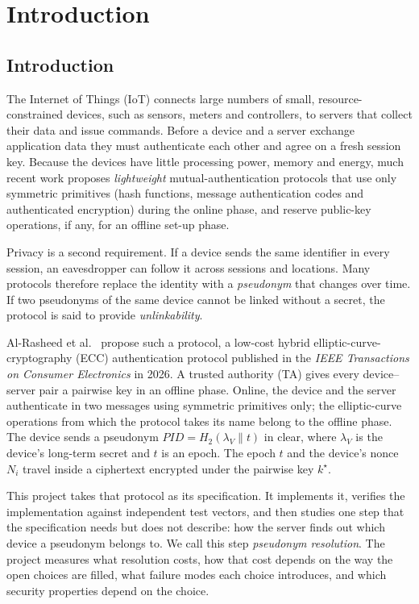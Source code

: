 \chapter{Introduction}

\section{Introduction}
The Internet of Things (IoT) connects large numbers of small, resource-constrained devices, such as sensors, meters and controllers, to servers that collect their data and issue commands. Before a device and a server exchange application data they must authenticate each other and agree on a fresh session key. Because the devices have little processing power, memory and energy, much recent work proposes \emph{lightweight} mutual-authentication protocols that use only symmetric primitives (hash functions, message authentication codes and authenticated encryption) during the online phase, and reserve public-key operations, if any, for an offline set-up phase.

Privacy is a second requirement. If a device sends the same identifier in every session, an eavesdropper can follow it across sessions and locations. Many protocols therefore replace the identity with a \emph{pseudonym} that changes over time. If two pseudonyms of the same device cannot be linked without a secret, the protocol is said to provide \emph{unlinkability}.

Al-Rasheed et al.~\cite{base} propose such a protocol, a low-cost hybrid elliptic-curve-cryptography (ECC) authentication protocol published in the \emph{IEEE Transactions on Consumer Electronics} in 2026. A trusted authority (TA) gives every device--server pair a pairwise key in an offline phase. Online, the device and the server authenticate in two messages using symmetric primitives only; the elliptic-curve operations from which the protocol takes its name belong to the offline phase. The device sends a pseudonym $PID=H_2(\lambda_V\|t)$ in clear, where $\lambda_V$ is the device's long-term secret and $t$ is an epoch. The epoch $t$ and the device's nonce $N_i$ travel inside a ciphertext encrypted under the pairwise key $k^\star$.

This project takes that protocol as its specification. It implements it, verifies the implementation against independent test vectors, and then studies one step that the specification needs but does not describe: how the server finds out which device a pseudonym belongs to. We call this step \emph{pseudonym resolution}. The project measures what resolution costs, how that cost depends on the way the open choices are filled, what failure modes each choice introduces, and which security properties depend on the choice.

